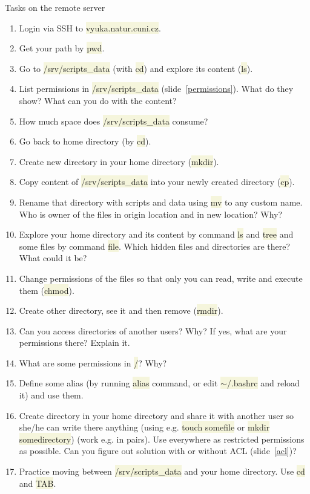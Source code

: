 \documentclass[compress, xelatex, 11pt, xcolor=svgnames, aspectratio=169,
	hyperref={
		bookmarks=true,
		unicode=true,
		colorlinks=true,
		pdftitle={Linux, command line and MetaCentrum},
		plainpages=false,
		pdfauthor={Vojtech Zeisek},
		pdfsubject={Course about use of Linux command line, writing shell scripts and using MetaCentrum of CESNET},
		pdfcreator={XeLaTeX},
		pdfkeywords={Linux, GNU, BASH, shell, command line, MetaCentrum},
		linkcolor=DarkRed, %
		anchorcolor=DarkBlue, %
		citecolor=Indigo, %
		filecolor=NavyBlue, %
		menucolor=DarkMagenta, %
		urlcolor=DarkBlue, %
		},
	url={hyphens, lowtilde} %
	]{beamer}
\renewcommand{\texttt}[1]{\colorbox{Beige}{{\ttfamily #1}}}
\begin{document}
\begin{frame}[allowframebreaks]{Tasks on the remote server}
	\begin{enumerate}
		\item Login via SSH to \texttt{vyuka.natur.cuni.cz}.
		\item Get your path by \texttt{pwd}.
		\item Go to \texttt{/srv/scripts\_data} (with \texttt{cd}) and explore its content (\texttt{ls}).
		\item List permissions in \texttt{/srv/scripts\_data} (slide~\ref{permissions}). What do they show? What can you do with the content?
		\item How much space does \texttt{/srv/scripts\_data} consume?
		\item Go back to home directory (by \texttt{cd}).
		\item Create new directory in your home directory (\texttt{mkdir}).
		\item Copy content of \texttt{/srv/scripts\_data} into your newly created directory (\texttt{cp}).
		\item Rename that directory with scripts and data using \texttt{mv} to any custom name. Who is owner of the files in origin location and in new location? Why?
		\item Explore your home directory and its content by command \texttt{ls} and \texttt{tree} and some files by command \texttt{file}. Which hidden files and directories are there? What could it be?
		\item Change permissions of the files so that only you can read, write and execute them (\texttt{chmod}).
		\item Create other directory, see it and then remove (\texttt{rmdir}).
		\item Can you access directories of another users? Why? If yes, what are your permissions there? Explain it.
		\item What are some permissions in \texttt{/}? Why?
		\item Define some alias (by running \texttt{alias} command, or edit \texttt{$\sim$/.bashrc} and reload it) and use them.
		\item Create directory in your home directory and share it with another user so she/he can write there anything (using e.g. \texttt{touch somefile} or \texttt{mkdir somedirectory}) (work e.g. in pairs). Use everywhere as restricted permissions as possible. Can you figure out solution with or without ACL (slide~\ref{acl})?
		\item Practice moving between \texttt{/srv/scripts\_data} and your home directory. Use \texttt{cd} and \texttt{TAB}.

\end{enumerate}
\end{frame}
\end{document}
